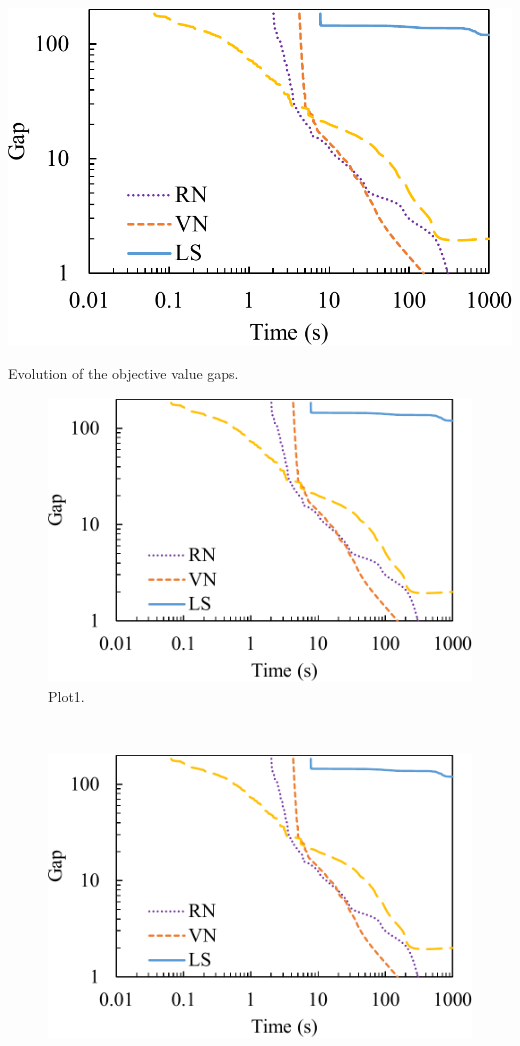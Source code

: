 \documentclass{article}
\begin{document}
\begin{szxfig}[!tb]
	\includegraphics[width=0.5\columnwidth]{fig-SampleFigure.pdf}
	\caption{Evolution of the objective value gaps.}
	\label{fig:columnwidth}
\end{szxfig}


\begin{szxfig*}[!tb]
	\centering
	\begin{subfigure}[b]{0.31\textwidth}
		\includegraphics[width=\textwidth]{fig-SampleFigure.pdf}
		\caption{Plot1.}
		\label{fig:convergence1}
	\end{subfigure}
	~
	\begin{subfigure}[b]{0.31\textwidth}
		\includegraphics[width=\textwidth]{fig-SampleFigure.pdf}

\end{subfigure}
\end{szxfig*}
\end{document}

